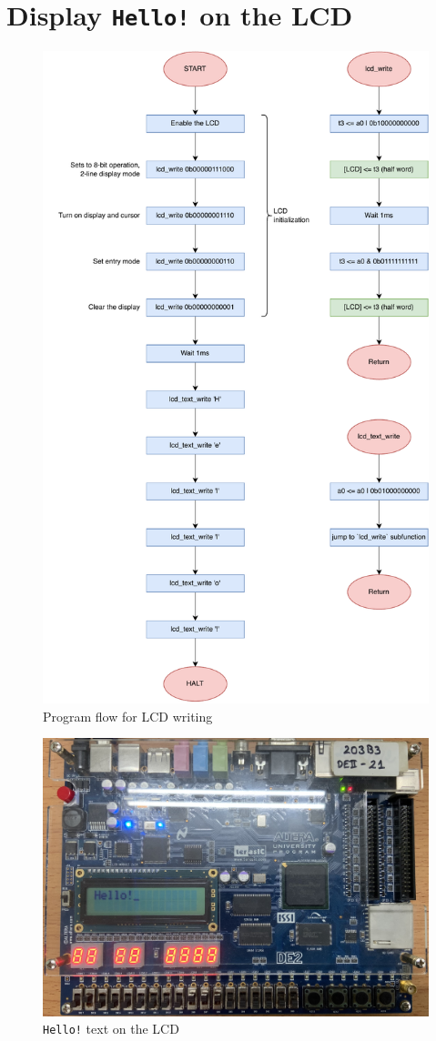 \documentclass[12pt,a4paper,oneside]{book} %
\begin{document}
\section{Display \texttt{Hello!} on the LCD}
\begin{figure}[H]
    \centering
    \includegraphics[width=.8\textwidth]{images/flowchart/lcd.pdf}
    \caption{Program flow for LCD writing}
\end{figure}

\begin{figure}[H]
    \centering
    \includegraphics[width=.80\textwidth]{images/hello.jpg}
    \caption{\texttt{Hello!} text on the LCD}
\end{figure}
\end{document}
